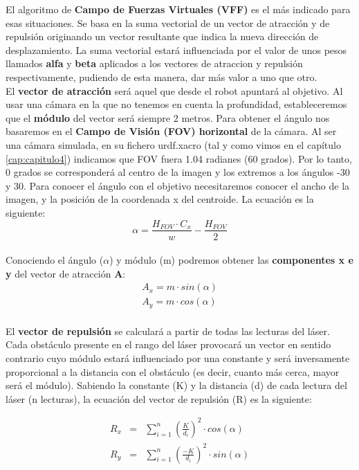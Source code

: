 El algoritmo de \textbf{Campo de Fuerzas Virtuales (VFF)} es el más indicado para esas situaciones. Se basa en la suma vectorial de un vector de atracción y de repulsión originando un vector resultante que indica la nueva dirección de desplazamiento. La suma vectorial estará influenciada por el valor de unos pesos llamados \textbf{alfa} y \textbf{beta} aplicados a los vectores de atraccion y repulsión respectivamente, pudiendo de esta manera, dar más valor a uno que otro.\\

El \textbf{vector de atracción} será aquel que desde el robot apuntará al objetivo. Al usar una cámara en la que no tenemos en cuenta la profundidad, estableceremos que el \textbf{módulo} del vector será siempre 2 metros. Para obtener el ángulo nos basaremos en el \textbf{Campo de Visión (FOV) horizontal} de la cámara. Al ser una cámara simulada, en su fichero urdf.xacro (tal y como vimos en el capítulo \ref{cap:capitulo4}) indicamos que FOV fuera 1.04 radianes (60 grados). Por lo tanto, 0 grados se corresponderá al centro de la imagen y los extremos a los ángulos -30 y 30. Para conocer el ángulo con el objetivo necesitaremos conocer el ancho de la imagen, y la posición de la coordenada x del centroide. La ecuación es la siguiente:\\

\begin{equation*}
\alpha = \frac{H_{FOV} \cdot C_{x}}{w} - \frac{H_{FOV}}{2}
\end{equation*}\\

Conociendo el ángulo ($\alpha$) y módulo (m) podremos obtener las \textbf{componentes x e y} del vector de atracción \textbf{A}:
\begin{eqnarray*}
A_x = m \cdot sin(\alpha)\\
A_y = m \cdot cos(\alpha)\\
\end{eqnarray*}

El \textbf{vector de repulsión} se calculará a partir de todas las lecturas del láser. Cada obstáculo presente en el rango del láser provocará un vector en sentido contrario cuyo módulo estará influenciado por una constante y será inversamente proporcional a la distancia con el obstáculo (es decir, cuanto más cerca, mayor será el módulo). Sabiendo la constante (K) y la distancia (d) de cada lectura del láser (n lecturas), la ecuación del vector de repulsión (R) es la siguiente:

\begin{eqnarray*}
R_x &=& \sum_{i=1}^n\left(\frac{K}{d_i}\right)^2 \cdot cos(\alpha)\\
R_y &=& \sum_{i=1}^n\left(\frac{-K}{d_i}\right)^2 \cdot sin(\alpha)\\
\end{eqnarray*}

